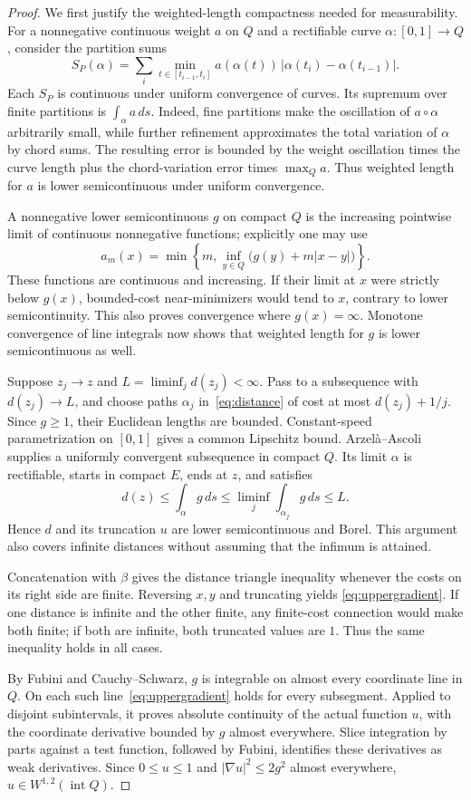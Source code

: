\documentclass[11pt]{article}
\begin{document}
\begin{proof}
We first justify the weighted-length compactness needed for measurability.
For a nonnegative continuous weight $a$ on $Q$ and a rectifiable curve
$\alpha:[0,1]\to Q$, consider the partition sums
\[
 S_P(\alpha)=\sum_i
 \min_{t\in[t_{i-1},t_i]}a(\alpha(t))\,
             |\alpha(t_i)-\alpha(t_{i-1})|.
\]
Each $S_P$ is continuous under uniform convergence of curves. Its supremum
over finite partitions is $\int_\alpha a\,ds$. Indeed, fine partitions make
the oscillation of $a\circ\alpha$ arbitrarily small, while further refinement
approximates the total variation of $\alpha$ by chord sums. The resulting
error is bounded by the weight oscillation times the curve length plus the
chord-variation error times $\max_Qa$. Thus weighted length for $a$ is lower
semicontinuous under uniform convergence.

A nonnegative lower semicontinuous $g$ on compact $Q$ is the increasing
pointwise limit of continuous nonnegative functions; explicitly one may use
\[
 a_m(x)=\min\left\{m,\inf_{y\in Q}\bigl(g(y)+m|x-y|\bigr)\right\}.
\]
These functions are continuous and increasing. If their limit at $x$ were
strictly below $g(x)$, bounded-cost near-minimizers would tend to $x$, contrary
to lower semicontinuity. This also proves convergence where $g(x)=\infty$.
Monotone convergence of line integrals now shows that weighted length for
$g$ is lower semicontinuous as well.

Suppose $z_j\to z$ and $L=\liminf_jd(z_j)<\infty$. Pass to a subsequence
with $d(z_j)\to L$, and choose paths $\alpha_j$ in~\eqref{eq:distance} of
cost at most $d(z_j)+1/j$. Since $g\geq1$, their Euclidean lengths are
bounded. Constant-speed parametrization on $[0,1]$ gives a common Lipschitz
bound. Arzel\`a--Ascoli supplies a uniformly convergent subsequence in compact
$Q$. Its limit $\alpha$ is rectifiable, starts in compact $E$, ends at $z$,
and satisfies
\[
 d(z)\leq\int_\alpha g\,ds
       \leq\liminf_j\int_{\alpha_j}g\,ds\leq L.
\]
Hence $d$ and its truncation $u$ are lower semicontinuous and Borel. This
argument also covers infinite distances without assuming that the infimum
is attained.

Concatenation with $\beta$ gives the distance triangle inequality whenever
the costs on its right side are finite. Reversing $x,y$ and truncating yields
\eqref{eq:uppergradient}. If one distance is infinite and the other finite,
any finite-cost connection would make both finite; if both are infinite,
both truncated values are $1$. Thus the same inequality holds in all cases.

By Fubini and Cauchy--Schwarz, $g$ is integrable on almost every coordinate
line in $Q$. On each such line~\eqref{eq:uppergradient} holds for every
subsegment. Applied to disjoint subintervals, it proves absolute continuity
of the actual function $u$, with the coordinate derivative bounded by $g$
almost everywhere. Slice integration by parts against a test function,
followed by Fubini, identifies these derivatives as weak derivatives.
Since $0\leq u\leq1$ and $|\nabla u|^2\leq2g^2$ almost everywhere,
$u\in W^{1,2}(\operatorname{int}Q)$.
\end{proof}
\end{document}
